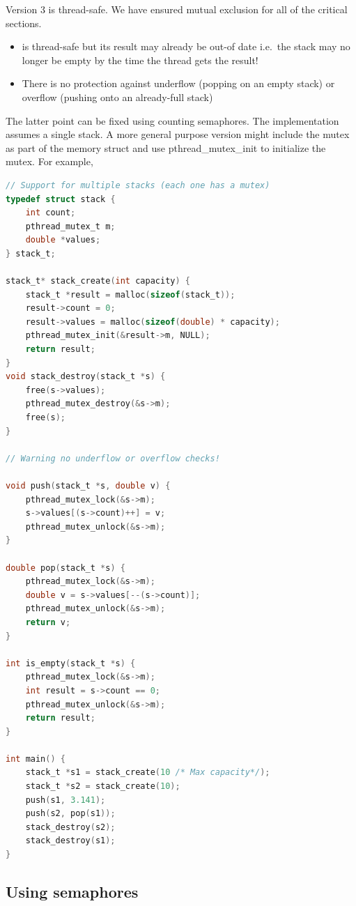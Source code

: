 Version 3 is thread-safe. We have ensured mutual exclusion for all of the critical sections.
\begin{itemize}
\item {} is thread-safe but its result may already be out-of date i.e.~the stack may no longer be empty by the time the thread gets the result! 
\item There is no protection against underflow (popping on an empty stack) or overflow (pushing onto an already-full stack)
\end{itemize}

The latter point can be fixed using counting semaphores. The implementation assumes a single stack. A more general purpose version might include the mutex as part of the memory struct and use pthread\_mutex\_init to initialize the mutex. For example,

\begin{lstlisting}[language=C]
// Support for multiple stacks (each one has a mutex)
typedef struct stack {
    int count;
    pthread_mutex_t m; 
    double *values;
} stack_t;

stack_t* stack_create(int capacity) {
    stack_t *result = malloc(sizeof(stack_t));
    result->count = 0;
    result->values = malloc(sizeof(double) * capacity);
    pthread_mutex_init(&result->m, NULL);
    return result;
}
void stack_destroy(stack_t *s) {
    free(s->values);
    pthread_mutex_destroy(&s->m);
    free(s);
}

// Warning no underflow or overflow checks!

void push(stack_t *s, double v) { 
    pthread_mutex_lock(&s->m); 
    s->values[(s->count)++] = v; 
    pthread_mutex_unlock(&s->m);
}

double pop(stack_t *s) { 
    pthread_mutex_lock(&s->m); 
    double v = s->values[--(s->count)]; 
    pthread_mutex_unlock(&s->m); 
    return v;
}

int is_empty(stack_t *s) { 
    pthread_mutex_lock(&s->m); 
    int result = s->count == 0; 
    pthread_mutex_unlock(&s->m);
    return result;
}

int main() {
    stack_t *s1 = stack_create(10 /* Max capacity*/);
    stack_t *s2 = stack_create(10);
    push(s1, 3.141);
    push(s2, pop(s1));
    stack_destroy(s2);
    stack_destroy(s1);
}
\end{lstlisting}

\subsection{Using semaphores}\label{stack-semaphores}

